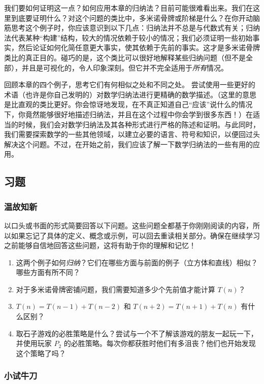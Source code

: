 我们要如何证明这一点？如何应用本章的归纳法？目前可能很难看出来。我们在这里到底要证明什么？对这个问题的类比中，多米诺骨牌或阶梯是什么？在你开动脑筋思考这个例子时，你应该意识到以下几点：归纳法并不总是与代数式有关；归纳法代表某种``构建''结构，较大的情况依赖于较小的情况；我们必须证明一些初始事实，然后论证如何化简任意更大事实，使其依赖于先前的事实。这才是多米诺骨牌类比的真正目的。碰巧的是，这个类比可以很好地解释某些归纳问题（但不是全部），并且是可视化的，令人印象深刻。但它并不完全适用于\emph{所有}情况。

回顾本章的四个例子，思考它们有何相似之处和不同之处。 尝试使用一些更好的术语（也许是你自己发明的）对数学归纳法进行更精确的数学描述。（这里的意思是比直观的类比更好。你会惊讶地发现，在不真正知道自己``应该''说什么的情况下，你竟然能够很好地描述归纳法，并且在这个过程中你会学到很多东西！）在适当的时候，我们会对数学归纳法及其各种形式进行严格的陈述和证明。与此同时，我们需要探索数学的一些其他领域，以建立必要的语言、符号和知识，以便回过头解决这个问题。不过，在开始之前，我们应该了解一下数学归纳法的一些有用的应用。

\subsection{习题}

\subsubsection*{温故知新}

以口头或书面的形式简要回答以下问题。这些问题全都基于你刚刚阅读的内容，所以如果忘记了具体的定义、概念或示例，可以回去重读相关部分。确保在继续学习之前能够自信地回答这些问题，这将有助于你的理解和记忆！

\begin{enumerate}[label=(\arabic*)]
    \item 这两个例子如何\emph{归纳}？它们在哪些方面与前面的例子（立方体和直线）相似？哪些方面有所不同？
    \item 对于多米诺骨牌密铺问题，我们需要知道多少个先前值才能计算 $T(n)$？
    \item $T(n) = T(n - 1) + T(n - 2)$ 和 $T(n + 2) = T(n + 1) + T(n)$ 有什么区别？
    \item 取石子游戏的必胜策略是什么？尝试与一个不了解该游戏的朋友一起玩一下，并使用玩家 $P_2$ 的必胜策略。每次你都获胜时他们有多沮丧？他们也开始发现这个策略了吗？
\end{enumerate}

\subsubsection*{小试牛刀}

